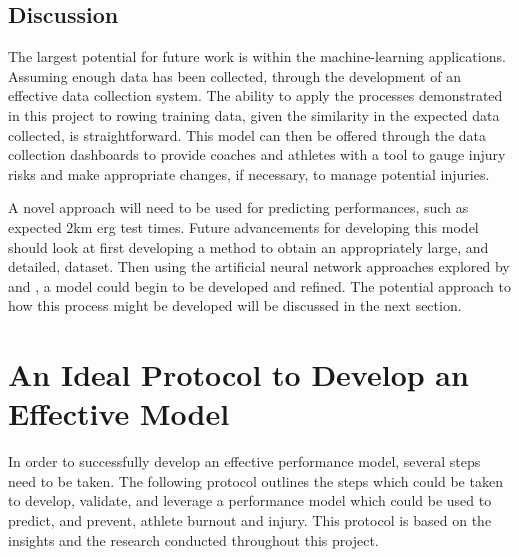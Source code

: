 \subsection{Discussion}
The largest potential for future work is within the machine-learning applications. Assuming enough data has been collected, through the development of an effective data collection system. The ability to apply the processes demonstrated in this project to rowing training data, given the similarity in the expected data collected, is straightforward. This model can then be offered through the data collection dashboards to provide coaches and athletes with a tool to gauge injury risks and make appropriate changes, if necessary, to manage potential injuries.

A novel approach will need to be used for predicting performances, such as expected 2km erg test times. Future advancements for developing this model should look at first developing a method to obtain an appropriately large, and detailed, dataset. Then using the artificial neural network approaches explored by \textcite{Edelmannnusser2002} and \textcite{Churchill2014}, a model could begin to be developed and refined. The potential approach to how this process might be developed will be discussed in the next section.

\section{\label{sec:model-devel-prot}An Ideal Protocol to Develop an Effective Model}
In order to successfully develop an effective performance model, several steps need to be taken. The following protocol outlines the steps which could be taken to develop, validate, and leverage a performance model which could be used to predict, and prevent, athlete burnout and injury. This protocol is based on the insights and the research conducted throughout this project.

